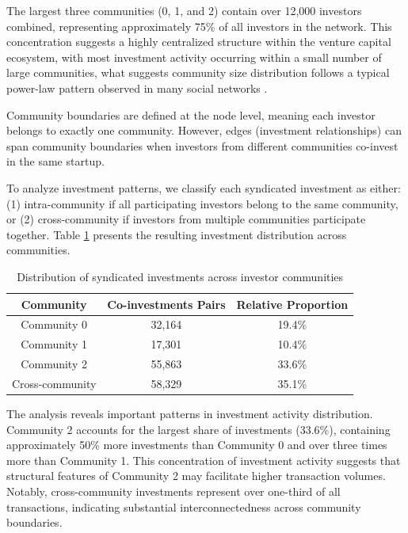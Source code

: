 The largest three communities (0, 1, and 2) contain over 12,000 investors combined, representing approximately 75\% of all investors in the network. This concentration suggests a highly centralized structure within the venture capital ecosystem, with most investment activity occurring within a small number of large communities, what suggests community size distribution follows a typical power-law pattern observed in many social networks \cite{Borgatti2011}. 



Community boundaries are defined at the node level, meaning each investor belongs to exactly one community. However, edges (investment relationships) can span community boundaries when investors from different communities co-invest in the same startup.

To analyze investment patterns, we classify each syndicated investment as either: (1) intra-community if all participating investors belong to the same community, or (2) cross-community if investors from multiple communities participate together. Table \ref{tab:investment_distribution} presents the resulting investment distribution across communities.

\begin{table}[htbp]
\centering
\begin{tabular}{|c|c|c|}
\hline
\textbf{Community} & \textbf{Co-investments Pairs} & \textbf{Relative Proportion} \\
\hline
Community 0 & 32,164 & 19.4\% \\
Community 1 & 17,301 & 10.4\% \\
Community 2 & 55,863 & 33.6\% \\
Cross-community & 58,329 & 35.1\% \\
\hline
\end{tabular}
\caption{Distribution of syndicated investments across investor communities}
\label{tab:investment_distribution}
\end{table}

The analysis reveals important patterns in investment activity distribution. Community 2 accounts for the largest share of investments (33.6\%), containing approximately 50\% more investments than Community 0 and over three times more than Community 1. This concentration of investment activity suggests that structural features of Community 2 may facilitate higher transaction volumes. Notably, cross-community investments represent over one-third of all transactions, indicating substantial interconnectedness across community boundaries.

